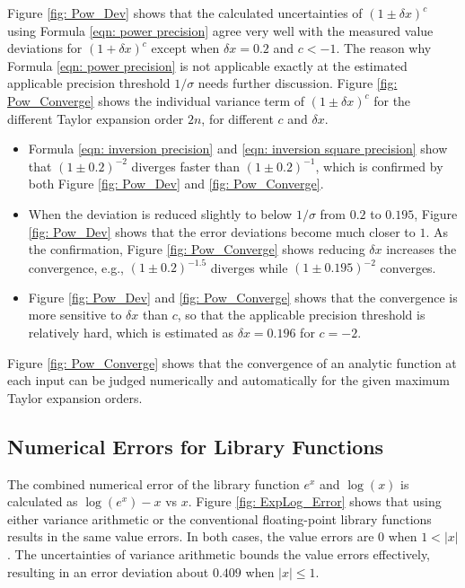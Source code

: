 \documentclass[twoside]{article}
\numberwithin{equation}{section}
\begin{document}
Figure \ref{fig: Pow_Dev} shows that the calculated uncertainties of $(1 \pm \delta x)^c$ using Formula \eqref{eqn: power precision} agree very well with the measured value deviations for $(1 + \delta x)^c$ except when $\delta x =0.2$ and $c < -1$.
The reason why Formula \eqref{eqn: power precision} is not applicable exactly at the estimated applicable precision threshold $1/\sigma$ needs further discussion.
Figure \ref{fig: Pow_Converge} shows the individual variance term of $(1 \pm \delta x)^c$ for the different Taylor expansion order $2n$, for different $c$ and $\delta x$.
\begin{itemize}

\item Formula \eqref{eqn: inversion precision} and \eqref{eqn: inversion square precision} show that $(1 \pm 0.2)^{-2}$ diverges faster than $(1 \pm 0.2)^{-1}$, which is confirmed by both Figure \ref{fig: Pow_Dev} and \ref{fig: Pow_Converge}.

\item 
When the deviation is reduced slightly to below $1/\sigma$ from $0.2$ to $0.195$, Figure \ref{fig: Pow_Dev} shows that the error deviations become much closer to $1$.  
As the confirmation, Figure \ref{fig: Pow_Converge} shows reducing $\delta x$ increases the convergence, e.g., $(1 \pm 0.2)^{-1.5}$ diverges while $(1 \pm 0.195)^{-2}$ converges.

\item Figure \ref{fig: Pow_Dev} and \ref{fig: Pow_Converge} shows that the convergence is more sensitive to $\delta x$ than $c$, so that the applicable precision threshold is relatively hard, which is estimated as $\delta x = 0.196$ for $c=-2$.

\end{itemize}
Figure \ref{fig: Pow_Converge} shows that the convergence of an analytic function at each input can be judged numerically and automatically for the given maximum Taylor expansion orders.



\subsection{Numerical Errors for Library Functions}

The combined numerical error of the library function $e^x$ and $\log(x)$ is calculated as $\log(e^x) - x$ vs $x$.
Figure \ref{fig: ExpLog_Error} shows that using either variance arithmetic or the conventional floating-point library functions results in the same value errors.  
In both cases, the value errors are $0$ when $1 < |x|$.
The uncertainties of variance arithmetic bounds the value errors effectively, resulting in an error deviation about $0.409$ when $|x| \leq 1$.
\end{document}
